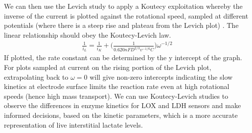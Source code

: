 \begin{appendices}
We can then use the Levich study to apply a Koutecy exploitation whereby the inverse of the current is plotted against the rotational speed, sampled at different potentials (where there is a steep rise and plateau from the Levich plot) \cite{nikolic2000theoretical}. The linear relationship should obey the Koutecy-Levich law. 
\begin{align}
    \frac{1}{i_{L}} = \frac{1}{i_{K}}+\bigg(\frac{1}{0.620nFD^{2/3}v^{-1/6}C}\bigg)\omega^{-1/2}
\end{align}
If plotted, the rate constant can be determined by the y intercept of the graph.
For plots sampled at current on the rising portion of the Levich plot, extrapolating back to $\omega=0$ will give non-zero intercepts indicating the slow kinetics at electrode surface limits the reaction rate even at high rotational speeds (hence high mass transport). 
We can use Koutecy-Levich studies to observe the differences in enzyme kinetics for LOX and LDH sensors and make informed decisions, based on the kinetic parameters, which is a more accurate representation of live interstitial lactate levels.
\newpage

\end{appendices}

